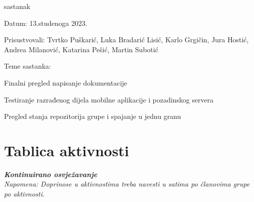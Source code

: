 \begin{packed_enum}
			\item  sastanak
			\item[] \begin{packed_item}
				\item Datum: 13.studenoga 2023.
				\item Prisustvovali: Tvrtko Puškarić, Luka Bradarić Lisić, Karlo Grgičin, Jura Hostić, Andrea Milanović, Katarina Pešić, Martin Subotić
				\item Teme sastanka:
				\begin{packed_item}
					\item Finalni pregled napisanje dokumentacije
					\item Testiranje razrađenog dijela mobilne aplikacije i pozadinskog servera
					\item Pregled stanja repozitorija grupe i spajanje u jednu granu
				\end{packed_item}
			\end{packed_item}
			
			
		\end{packed_enum}
		
		\eject
		\section*{Tablica aktivnosti}
		
			\textbf{\textit{Kontinuirano osvježavanje}}\\
			
			 \textit{Napomena: Doprinose u aktivnostima treba navesti u satima po članovima grupe po aktivnosti.}

